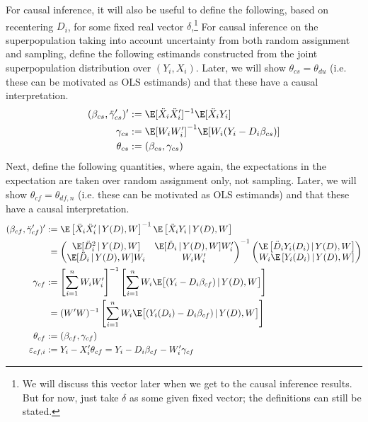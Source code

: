 \documentclass[12pt]{article}
\theoremstyle{plain}
\theoremstyle{definition}
\theoremstyle{remark}
\newcommand{\sumin}{\sum^n_{i=1}}
\begin{document}
\clearpage
For causal inference, it will also be useful to define the following,
based on recentering $D_i$, for some fixed real vector
$\delta$,\footnote{%
  We will discuss this vector later when we get to the causal inference
  results.
  But for now, just take $\delta$ as some given fixed vector; the
  definitions can still be stated.
}
For causal inference on the superpopulation taking into account
uncertainty from both random assignment and sampling, define the
following estimands constructed from the joint superpopulation
distribution over $(Y_i,X_i)$.
Later, we will show $\theta_{cs}=\theta_{du}$ (i.e. these can be
motivated as OLS estimands) and that these have a causal interpretation.
\begin{align*}
    (\beta_{cs},\ddot{\gamma}_{cs}')'
    &:=
    \E[\ddot{X}_i\ddot{X}_i']^{-1}\E[\ddot{X}_iY_i]
    \\
    \gamma_{cs}
    &:=
    \E[W_iW_i']^{-1}
    \E[W_i(Y_i-D_i\beta_{cs})]
    \\
    \theta_{cs}
    &:=
    (\beta_{cs},\gamma_{cs})
\end{align*}
Next, define the following quantities, where again, the expectations in
the expectation are taken over random assignment only, not sampling.
Later, we will show $\theta_{cf}=\theta_{df,n}$ (i.e. these can be
motivated as OLS estimands) and that these have a causal interpretation.
\begin{align*}
    (\beta_{cf},\ddot{\gamma}_{cf}')'
    &:=
    \E\left[
    \ddot{X}_i\ddot{X}_i'
    \,|\,
    Y(D),W
    \right]^{-1}
    \E
    \left[
    \ddot{X}_iY_i
    \,|\,
    Y(D),W
    \right]
    \\
    &\hphantom{:}=
    \begin{pmatrix}
      \E[
      \ddot{D}_i^2
      \,|\,
      Y(D),W
      ]
      &
      \E[
      \ddot{D}_i
      \,|\,
      Y(D),W
      ]
      W_i'
      \\
      \E[
      \ddot{D}_i
      \,|\,
      Y(D),W
      ]
      W_i
      & W_iW_i'
    \end{pmatrix}^{-1}
    \begin{pmatrix}
    \E
    \left[
    \ddot{D}_iY_i(D_i)
    \,|\,
    Y(D),W
    \right]
    \\
    W_i
    \E
    \left[
    Y_i(D_i)
    \,|\,
    Y(D),W
    \right]
    \end{pmatrix}
    \\
    \gamma_{cf}
    &:=
    \left[
    \sumin
    W_iW_i'
    \right]^{-1}
    \left[
    \sumin
    W_i
    \E\big[
    (Y_i-D_i\beta_{cf})
    \,|\,
    Y(D),W
    \big]
    \right]
    \\
    &\hphantom{:}=
    (W'W)^{-1}
    \left[
    \sumin
    W_i
    \E\big[
    (Y_i(D_i)-D_i\beta_{cf})
    \,|\,
    Y(D),W
    \big]
    \right]
    \\
    \theta_{cf}
    &:=
    (\beta_{cf},\gamma_{cf})
    \\
    \varepsilon_{cf,i}
    &:=
    Y_i-X_i'\theta_{cf}
    =
    Y_i
    -D_i\beta_{cf}
    -W_i'\gamma_{cf}
\end{align*}
\end{document}
